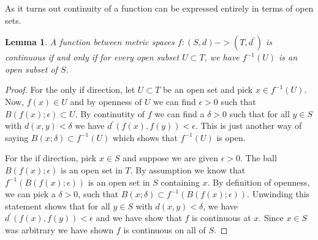 \documentclass{amsart}
\newtheorem{lem}[thm]{Lemma}
\theoremstyle{remark}
\theoremstyle{definition}
\begin{document}
As it turns out continuity of a function can be expressed entirely in
terms of open sets.
\begin{lem}A function between metric spaces $f : (S,d) -> (T,d^\prime)$ is continuous
  if and only if for every open subset $U \subset T$, we have $f^{-1}(U)$ is an
  open subset of $S$.
\end{lem}
\begin{proof}For the only if direction, let $U \subset T$ be an open set and pick $x \in
  f^{-1}(U)$.  Now, $f(x) \in U$ and by openness of $U$ we can find $\epsilon
  > 0$ such that $B(f(x); \epsilon) \subset U$.  By continutity of $f$
  we can find a $\delta > 0$ such that for all $y \in S$ with $d(x,y) <
  \delta$ we  have $d^\prime(f(x),f(y)) < \epsilon$.  This is just
  another way of saying $B(x; \delta) \subset f^{-1}(U)$ which shows
  that $f^{-1}(U)$ is open.

For the if direction, pick $x \in S$ and suppose we are given
$\epsilon > 0$.  The ball $B(f(x); \epsilon)$ is an open set in $T$.  
By assumption we know that $f^{-1}(B(f(x); \epsilon))$ is
an open set in $S$ containing $x$.   By definition of openness, we can pick a $\delta > 0$, such that 
$B(x;\delta) \subset f^{-1}(B(f(x); \epsilon))$.  Unwinding this
statement shows that for all $y \in S$ with $d(x,y) < \delta$, we have
$d^\prime(f(x),f(y)) < \epsilon$ and we have show that $f$ is
continuous at $x$.  Since $x \in S$ was arbitrary we have shown $f$ is
continuous on all of $S$.
\end{proof}
\end{document}
